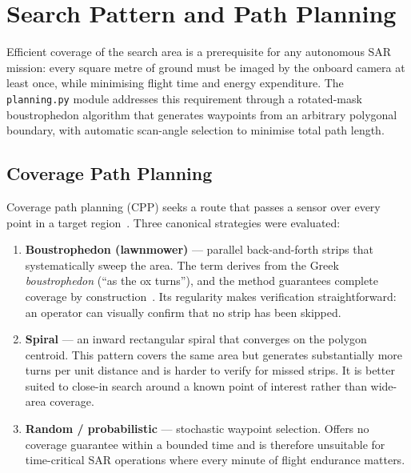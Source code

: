 \section{Search Pattern and Path Planning}\label{sec:planning}

Efficient coverage of the search area is a prerequisite for any autonomous SAR mission: every square metre of ground must be imaged by the onboard camera at least once, while minimising flight time and energy expenditure. The \texttt{planning.py} module addresses this requirement through a rotated-mask boustrophedon algorithm that generates waypoints from an arbitrary polygonal boundary, with automatic scan-angle selection to minimise total path length.

\subsection{Coverage Path Planning}\label{sec:cpp}

Coverage path planning (CPP) seeks a route that passes a sensor over every point in a target region~\cite{galceran2013survey}. Three canonical strategies were evaluated:

\begin{enumerate}
  \item \textbf{Boustrophedon (lawnmower)} --- parallel back-and-forth strips that systematically sweep the area. The term derives from the Greek \textit{boustrophedon} (``as the ox turns''), and the method guarantees complete coverage by construction~\cite{choset2001coverage}. Its regularity makes verification straightforward: an operator can visually confirm that no strip has been skipped.
  \item \textbf{Spiral} --- an inward rectangular spiral that converges on the polygon centroid. This pattern covers the same area but generates substantially more turns per unit distance and is harder to verify for missed strips. It is better suited to close-in search around a known point of interest rather than wide-area coverage.
  \item \textbf{Random / probabilistic} --- stochastic waypoint selection. Offers no coverage guarantee within a bounded time and is therefore unsuitable for time-critical SAR operations where every minute of flight endurance matters.
\end{enumerate}

